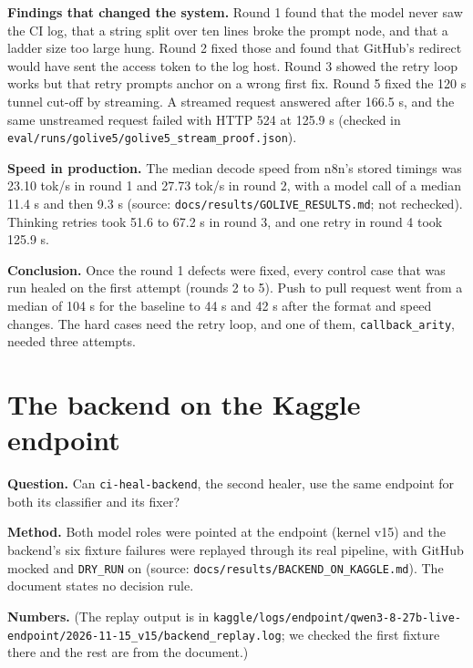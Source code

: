 \documentclass[11pt,a4paper]{report}
\begin{document}
\textbf{Findings that changed the system.} Round 1 found that the model never saw the CI log, that a string split over ten lines broke the prompt node, and that a ladder size too large hung. Round 2 fixed those and found that GitHub's redirect would have sent the access token to the log host. Round 3 showed the retry loop works but that retry prompts anchor on a wrong first fix. Round 5 fixed the 120 s tunnel cut-off by streaming. A streamed request answered after 166.5 s, and the same unstreamed request failed with HTTP 524 at 125.9 s (checked in \texttt{eval/\allowbreak{}runs/\allowbreak{}golive5/\allowbreak{}golive5\_\allowbreak{}stream\_\allowbreak{}proof.\allowbreak{}json}).

\textbf{Speed in production.} The median decode speed from n8n's stored timings was 23.10 tok/s in round 1 and 27.73 tok/s in round 2, with a model call of a median 11.4 s and then 9.3 s (source: \texttt{docs/\allowbreak{}results/\allowbreak{}GOLIVE\_\allowbreak{}RESULTS.\allowbreak{}md}; not rechecked). Thinking retries took 51.6 to 67.2 s in round 3, and one retry in round 4 took 125.9 s.

\textbf{Conclusion.} Once the round 1 defects were fixed, every control case that was run healed on the first attempt (rounds 2 to 5). Push to pull request went from a median of 104 s for the baseline to 44 s and 42 s after the format and speed changes. The hard cases need the retry loop, and one of them, \texttt{callback\_\allowbreak{}arity}, needed three attempts.

\section{The backend on the Kaggle endpoint}

\textbf{Question.} Can \texttt{ci-\allowbreak{}heal-\allowbreak{}backend}, the second healer, use the same endpoint for both its classifier and its fixer?

\textbf{Method.} Both model roles were pointed at the endpoint (kernel v15) and the backend's six fixture failures were replayed through its real pipeline, with GitHub mocked and \texttt{DRY\_\allowbreak{}RUN} on (source: \texttt{docs/\allowbreak{}results/\allowbreak{}BACKEND\_\allowbreak{}ON\_\allowbreak{}KAGGLE.\allowbreak{}md}). The document states no decision rule.

\textbf{Numbers.} (The replay output is in \texttt{kaggle/\allowbreak{}logs/\allowbreak{}endpoint/\allowbreak{}qwen3-\allowbreak{}8-\allowbreak{}27b-\allowbreak{}live-\allowbreak{}endpoint/\allowbreak{}2026-\allowbreak{}11-\allowbreak{}15\_\allowbreak{}v15/\allowbreak{}backend\_\allowbreak{}replay.\allowbreak{}log}; we checked the first fixture there and the rest are from the document.)
\end{document}
